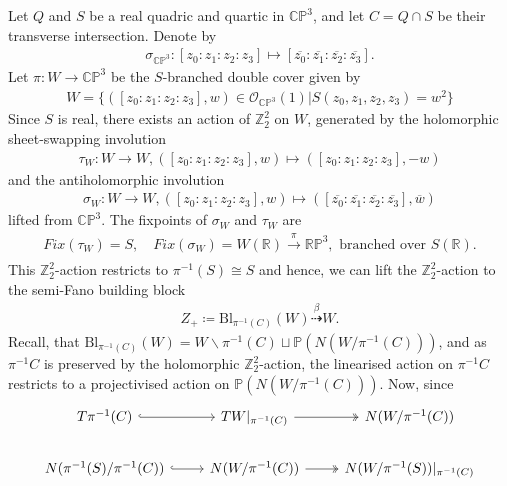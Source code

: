 \documentclass[psamsfonts]{amsart}
\theoremstyle{plain}
\theoremstyle{definition}{
\newtheorem{defi}{Definition}[section]
\newtheorem{ass}{Assumption}
\newtheorem*{nota}{Notation}}
\theoremstyle{remark}{
\newtheorem{rem}{Remark}
\newtheorem{ex}{Example}}
\theoremstyle{plain}{
\newtheorem{thm}{Theorem}[section]
\newtheorem{lem}{Lemma}[section]
\newtheorem{cor}{Corollary}[section]
\newtheorem{prop}{Proposition}[section]
\newtheorem{con}{Conjecture}[section]}
\newcommand{\m}[1]{{\mathrm{#1}}}
\begin{document}
\begin{ex}
Let $Q$ and $S$ be a real quadric and quartic in $\mathbb{CP}^3$, and let $C = Q \cap S$ be their transverse intersection. Denote by 
\begin{align*}
    \sigma_{\mathbb{CP}^3}\colon [z_0:z_1:z_2:z_3] \mapsto [\overline{z_0} \colon\overline{z_1} \colon\overline{z_2} \colon\overline{z_3}].
\end{align*}
Let $\pi\colon  W \rightarrow \mathbb{CP}^3$ be the $S$-branched double cover given by 
\begin{align*}
    W=\{([z_0:z_1:z_2:z_3],w)\in\mathcal{O}_{\mathbb{CP}^3}(1)|S(z_0,z_1,z_2,z_3)=w^2\}
\end{align*}
Since $S$ is real, there exists an action of $\mathbb{Z}_2^2$ on $W$, generated by the holomorphic sheet-swapping involution
\begin{align*}
    \tau_W\colon  W \rightarrow W, ([z_0:z_1:z_2:z_3],w)\mapsto ([z_0:z_1:z_2:z_3],-w)
\end{align*}
and the antiholomorphic involution 
\begin{align*}
    \sigma_W\colon W\rightarrow W, ([z_0:z_1:z_2:z_3],w)\mapsto ([\overline{z_0} \colon\overline{z_1} \colon\overline{z_2} \colon\overline{z_3}],\overline{w})
\end{align*}
lifted from $\mathbb{CP}^3$. The fixpoints of $\sigma_W$ and $\tau_W$ are 
\begin{align*}
    Fix(\tau_W) = S, \quad   Fix(\sigma_{W})=W(\mathbb{R})\xrightarrow[]{\pi} \mathbb{RP}^3,\text{ branched over }S(\mathbb{R}).
\end{align*}
This $\mathbb{Z}^2_2$-action restricts to $\pi^{-1}(S)\cong S$ and hence, we can lift the $\mathbb{Z}_2^2$-action to the semi-Fano building block
\begin{align*}
    Z_+ \coloneqq \m{Bl}_{\pi^{-1}(C)}(W) \overset{\beta}{\dashrightarrow} W.
\end{align*}
Recall, that $\m{Bl}_{\pi^{-1}(C)}(W)=W\backslash \pi^{-1}(C) \sqcup \mathbb{P}(N (W/\pi^{-1}(C)))$, and as $\pi^{-1}C$ is preserved by the holomorphic $\mathbb{Z}_2^2$-action, the linearised action on $\pi^{-1}C$ restricts to a projectivised action on $\mathbb{P}(N(W/\pi^{-1}(C)))$. Now, since 
\begin{equation*}
    \begin{tikzcd}
        T\pi^{-1}(C)\arrow[r,hook]&TW|_{\pi^{-1}(C)}\arrow[r,two heads]& N (W/\pi^{-1}(C))\\
        N (\pi^{-1}(S)/\pi^{-1}(C))\arrow[r,hook]&N (W/\pi^{-1}(C))\arrow[r,two heads]& N (W/\pi^{-1}(S))|_{\pi^{-1}(C)}

\end{tikzcd}
\end{equation*}
\end{ex}
\end{document}
